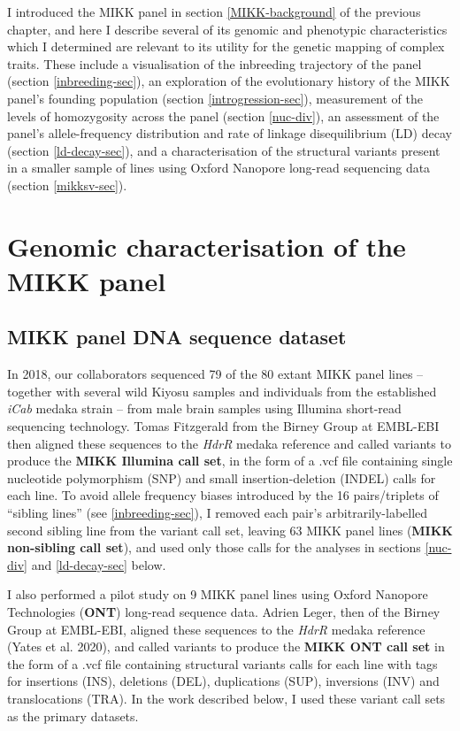 \documentclass[
]{book}
\begin{document}
I introduced the MIKK panel in section \ref{MIKK-background} of the previous chapter, and here I describe several of its genomic and phenotypic characteristics which I determined are relevant to its utility for the genetic mapping of complex traits. These include a visualisation of the inbreeding trajectory of the panel (section \ref{inbreeding-sec}), an exploration of the evolutionary history of the MIKK panel's founding population (section \ref{introgression-sec}), measurement of the levels of homozygosity across the panel (section \ref{nuc-div}), an assessment of the panel's allele-frequency distribution and rate of linkage disequilibrium (LD) decay (section \ref{ld-decay-sec}), and a characterisation of the structural variants present in a smaller sample of lines using Oxford Nanopore long-read sequencing data (section \ref{mikksv-sec}).

\hypertarget{genomic-characterisation-of-the-mikk-panel}{%
\section{Genomic characterisation of the MIKK panel}\label{genomic-characterisation-of-the-mikk-panel}}

\hypertarget{non-sib-calls}{%
\subsection{MIKK panel DNA sequence dataset}\label{non-sib-calls}}

In 2018, our collaborators sequenced 79 of the 80 extant MIKK panel lines -- together with several wild Kiyosu samples and individuals from the established \emph{iCab} medaka strain -- from male brain samples using Illumina short-read sequencing technology. Tomas Fitzgerald from the Birney Group at EMBL-EBI then aligned these sequences to the \emph{HdrR} medaka reference and called variants to produce the \textbf{MIKK Illumina call set}, in the form of a .vcf file containing single nucleotide polymorphism (SNP) and small insertion-deletion (INDEL) calls for each line. To avoid allele frequency biases introduced by the 16 pairs/triplets of ``sibling lines'' (see \ref{inbreeding-sec}), I removed each pair's arbitrarily-labelled second sibling line from the variant call set, leaving 63 MIKK panel lines (\textbf{MIKK non-sibling call set}), and used only those calls for the analyses in sections \ref{nuc-div} and \ref{ld-decay-sec} below.

I also performed a pilot study on 9 MIKK panel lines using Oxford Nanopore Technologies (\textbf{ONT}) long-read sequence data. Adrien Leger, then of the Birney Group at EMBL-EBI, aligned these sequences to the \emph{HdrR} medaka reference (Yates et al. 2020), and called variants to produce the \textbf{MIKK ONT call set} in the form of a .vcf file containing structural variants calls for each line with tags for insertions (INS), deletions (DEL), duplications (SUP), inversions (INV) and translocations (TRA). In the work described below, I used these variant call sets as the primary datasets.
\end{document}
